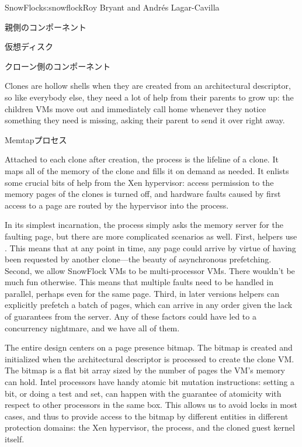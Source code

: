 \begin{aosachapter}{SnowFlock}{s:snowflock}{Roy Bryant and Andr\'e{s} Lagar-Cavilla}
\begin{aosasect1}{親側のコンポーネント}
\begin{aosasect2}{仮想ディスク}
\end{aosasect2}

\end{aosasect1}

\begin{aosasect1}{クローン側のコンポーネント}

Clones are hollow shells when they are created from an architectural
descriptor, so like everybody else, they need a lot of help from their
parents to grow up: the children VMs move out and immediately call
home whenever they notice something they need is missing, asking their
parent to send it over right away.

\begin{aosasect2}{Memtapプロセス}

Attached to each clone after creation, the  process is the
lifeline of a clone. It maps all of the memory of the clone and fills
it on demand as needed.  It enlists some crucial bits of help from the
Xen hypervisor: access permission to the memory pages of the clones is
turned off, and hardware faults caused by first access to a page are
routed by the hypervisor into the  process.

In its simplest incarnation, the  process simply asks the
memory server for the faulting page, but there are more complicated
scenarios as well.  First,  helpers use . This means that at any
point in time, any page could arrive by virtue of having been
requested by another clone---the beauty of asynchronous
prefetching. Second, we allow SnowFlock VMs to be multi-processor VMs.
There wouldn't be much fun otherwise. This means that multiple faults
need to be handled in parallel, perhaps even for the same page.
Third, in later versions  helpers can explicitly prefetch a
batch of pages, which can arrive in any order given the lack of
guarantees from the  server.  Any of these factors could have led
to a concurrency nightmare, and we have all of them.

The entire  design centers on a page presence bitmap. The bitmap
is created and initialized when the architectural descriptor is
processed to create the clone VM\@.
The bitmap is a flat bit array sized by the number of pages the VM's memory can hold. 
Intel processors have handy atomic
bit mutation instructions: setting a bit, or doing a test and set, can
happen with the guarantee of atomicity with respect to other
processors in the same box.  This allows us to avoid
locks in most cases, and thus to provide access to the bitmap by
different entities in different protection domains: the Xen
hypervisor, the  process, and the cloned guest kernel itself.


\end{aosasect2}
\end{aosasect1}
\end{aosachapter}
